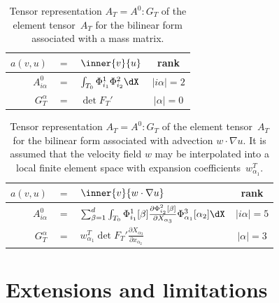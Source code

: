 \begin{table}[htbp]
  \begin{center}
    \linespread{2.0}
    \begin{tabular}{|rcl|c|}
      \hline
      $a(v, u)$ &$=$& $\inner{v}{u}$ & rank \\
      \hline
      \hline
      $A^0_{i\alpha}$ &$=$& $\int_{T_0} \Phi_{i_1}^{1} \Phi_{i_2}^{2} \dX$
      & $|i\alpha| = 2$ \\
      \hline
      $G_T^{\alpha}$ &$=$& $\det F_T'$
      & $|\alpha| = 0$ \\
      \hline
    \end{tabular}
    \linespread{1.0}
    \caption{Tensor representation $A_T = A^0 : G_T$ of the element
      tensor~$A_T$ for the bilinear form associated with a mass
      matrix.}
    \label{tab:mass}
  \end{center}
\end{table}

\begin{table}[htbp]
  \begin{center}
    \linespread{2.0}
    \begin{tabular}{|rcl|c|}
      \hline
      $a(v, u)$ &$=$& $\inner{v}{w \cdot \nabla u}$ & rank \\
      \hline
      \hline
      $A^0_{i\alpha}$ &$=$&
      $\sum_{\beta=1}^d
      \int_{T_0}
      \Phi^1_{i_1}[\beta]
      \frac{\partial \Phi^2_{i_2}[\beta]}{\partial X_{\alpha_3}}
      \Phi^3_{\alpha_1}[\alpha_2]
      \dX$
      & $|i\alpha| = 5$ \\
      \hline
      $G_T^{\alpha}$ &$=$&
      $w^T_{\alpha_1} \det F_T'
      \frac{\partial X_{\alpha_3}}{\partial x_{\alpha_2}}$
      & $|\alpha| = 3$ \\
      \hline
    \end{tabular}
    \linespread{1.0}
    \caption{Tensor representation $A_T = A^0 : G_T$ of the element
      tensor~$A_T$ for the bilinear form associated with advection $w
      \cdot \nabla u$. It is assumed that the velocity field $w$ may
      be interpolated into a local finite element space with expansion
      coefficients~$w^T_{\alpha_1}$.}
    \label{tab:advection}
  \end{center}
\end{table}

\section{Extensions and limitations}

